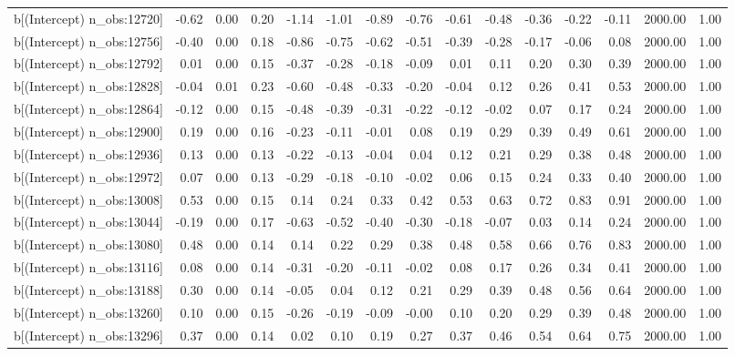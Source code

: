 \begin{table}[ht]
\begin{tabular}{rrrrrrrrrrrrrrr}
  b[(Intercept) n\_obs:12720] & -0.62 & 0.00 & 0.20 & -1.14 & -1.01 & -0.89 & -0.76 & -0.61 & -0.48 & -0.36 & -0.22 & -0.11 & 2000.00 & 1.00 \\ 
  b[(Intercept) n\_obs:12756] & -0.40 & 0.00 & 0.18 & -0.86 & -0.75 & -0.62 & -0.51 & -0.39 & -0.28 & -0.17 & -0.06 & 0.08 & 2000.00 & 1.00 \\ 
  b[(Intercept) n\_obs:12792] & 0.01 & 0.00 & 0.15 & -0.37 & -0.28 & -0.18 & -0.09 & 0.01 & 0.11 & 0.20 & 0.30 & 0.39 & 2000.00 & 1.00 \\ 
  b[(Intercept) n\_obs:12828] & -0.04 & 0.01 & 0.23 & -0.60 & -0.48 & -0.33 & -0.20 & -0.04 & 0.12 & 0.26 & 0.41 & 0.53 & 2000.00 & 1.00 \\ 
  b[(Intercept) n\_obs:12864] & -0.12 & 0.00 & 0.15 & -0.48 & -0.39 & -0.31 & -0.22 & -0.12 & -0.02 & 0.07 & 0.17 & 0.24 & 2000.00 & 1.00 \\ 
  b[(Intercept) n\_obs:12900] & 0.19 & 0.00 & 0.16 & -0.23 & -0.11 & -0.01 & 0.08 & 0.19 & 0.29 & 0.39 & 0.49 & 0.61 & 2000.00 & 1.00 \\ 
  b[(Intercept) n\_obs:12936] & 0.13 & 0.00 & 0.13 & -0.22 & -0.13 & -0.04 & 0.04 & 0.12 & 0.21 & 0.29 & 0.38 & 0.48 & 2000.00 & 1.00 \\ 
  b[(Intercept) n\_obs:12972] & 0.07 & 0.00 & 0.13 & -0.29 & -0.18 & -0.10 & -0.02 & 0.06 & 0.15 & 0.24 & 0.33 & 0.40 & 2000.00 & 1.00 \\ 
  b[(Intercept) n\_obs:13008] & 0.53 & 0.00 & 0.15 & 0.14 & 0.24 & 0.33 & 0.42 & 0.53 & 0.63 & 0.72 & 0.83 & 0.91 & 2000.00 & 1.00 \\ 
  b[(Intercept) n\_obs:13044] & -0.19 & 0.00 & 0.17 & -0.63 & -0.52 & -0.40 & -0.30 & -0.18 & -0.07 & 0.03 & 0.14 & 0.24 & 2000.00 & 1.00 \\ 
  b[(Intercept) n\_obs:13080] & 0.48 & 0.00 & 0.14 & 0.14 & 0.22 & 0.29 & 0.38 & 0.48 & 0.58 & 0.66 & 0.76 & 0.83 & 2000.00 & 1.00 \\ 
  b[(Intercept) n\_obs:13116] & 0.08 & 0.00 & 0.14 & -0.31 & -0.20 & -0.11 & -0.02 & 0.08 & 0.17 & 0.26 & 0.34 & 0.41 & 2000.00 & 1.00 \\ 
  b[(Intercept) n\_obs:13188] & 0.30 & 0.00 & 0.14 & -0.05 & 0.04 & 0.12 & 0.21 & 0.29 & 0.39 & 0.48 & 0.56 & 0.64 & 2000.00 & 1.00 \\ 
  b[(Intercept) n\_obs:13260] & 0.10 & 0.00 & 0.15 & -0.26 & -0.19 & -0.09 & -0.00 & 0.10 & 0.20 & 0.29 & 0.39 & 0.48 & 2000.00 & 1.00 \\ 
  b[(Intercept) n\_obs:13296] & 0.37 & 0.00 & 0.14 & 0.02 & 0.10 & 0.19 & 0.27 & 0.37 & 0.46 & 0.54 & 0.64 & 0.75 & 2000.00 & 1.00 \\ 

\end{tabular}
\end{table}
